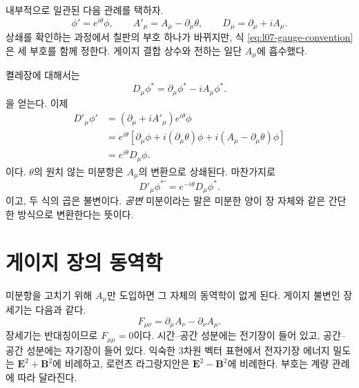 내부적으로 일관된 다음 관례를 택하자.
\begin{equation}
  \phi'=e^{i\theta}\phi,
  \qquad
  A'_\mu=A_\mu-\partial_\mu\theta,
  \qquad
  D_\mu=\partial_\mu+iA_\mu.
  \label{eq:l07-gauge-convention}
\end{equation}
상쇄를 확인하는 과정에서 칠판의 부호 하나가 바뀌지만, 식 \eqref{eq:l07-gauge-convention}은 세 부호를 함께 정한다. 게이지 결합 상수와 전하는 일단 \(A_\mu\)에 흡수했다.

켤레장에 대해서는
\begin{equation}
  D_\mu\phi^*=\partial_\mu\phi^*-iA_\mu\phi^*.
\end{equation}
을 얻는다. 이제
\begin{align}
  D'_\mu\phi'
  &=
  \left(\partial_\mu+iA'_\mu\right)e^{i\theta}\phi
  \nonumber\\
  &=
  e^{i\theta}
  \left[
    \partial_\mu\phi+i(\partial_\mu\theta)\phi
    +i(A_\mu-\partial_\mu\theta)\phi
  \right]
  \nonumber\\
  &=e^{i\theta}D_\mu\phi.
  \label{eq:l07-covariant-transform}
\end{align}
이다. \(\theta\)의 원치 않는 미분항은 \(A_\mu\)의 변환으로 상쇄된다. 마찬가지로
\begin{equation}
  D'_\mu\phi^{*\prime}=e^{-i\theta}D_\mu\phi^*.
\end{equation}
이고, 두 식의 곱은 불변이다. \emph{공변} 미분이라는 말은 미분한 양이 장 자체와 같은 간단한 방식으로 변환한다는 뜻이다.

\section{게이지 장의 동역학}

미분항을 고치기 위해 \(A_\mu\)만 도입하면 그 자체의 동역학이 없게 된다. 게이지 불변인 장세기는 다음과 같다.
\begin{equation}
  F_{\mu\nu}
  =\partial_\mu A_\nu-\partial_\nu A_\mu.
  \label{eq:l07-field-strength}
\end{equation}
장세기는 반대칭이므로 \(F_{\mu\mu}=0\)이다. 시간--공간 성분에는 전기장이 들어 있고, 공간--공간 성분에는 자기장이 들어 있다. 익숙한 3차원 벡터 표현에서 전자기장 에너지 밀도는 \(\bm E^2+\bm B^2\)에 비례하고, 로런츠 라그랑지안은 \(\bm E^2-\bm B^2\)에 비례한다. 부호는 계량 관례에 따라 달라진다.

